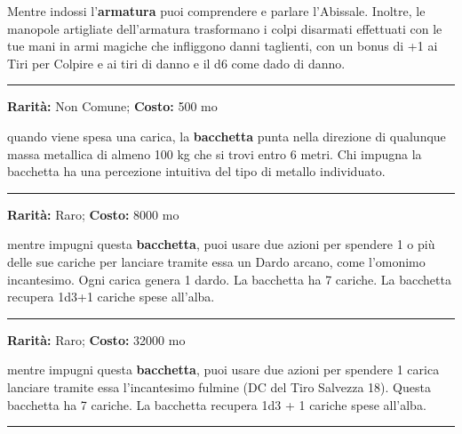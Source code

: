 \begin{multicols}{2}
Mentre indossi l'\textbf{armatura} puoi comprendere e parlare l'Abissale. Inoltre, le manopole artigliate dell'armatura trasformano i colpi disarmati effettuati con le tue mani in armi magiche che infliggono danni taglienti, con un bonus di +1 ai Tiri per Colpire e ai tiri di danno e il d6 come dado di danno.

\smallskip\noindent\rule{\linewidth}{2pt}  \hypertarget{BacchettaCercametalli}{}\medskip{}\noindent\label{BacchettaCercametalli}

\textbf{Rarità:} Non Comune; \textbf{Costo:} 500 mo

quando viene spesa una carica, la \textbf{bacchetta} punta nella direzione di qualunque massa metallica di almeno 100 kg che si trovi entro 6 metri. Chi impugna la bacchetta ha una percezione intuitiva del tipo di metallo individuato.

\smallskip\noindent\rule{\linewidth}{2pt}  \hypertarget{BacchettadeiDardiArcani}{}\medskip{}\noindent\label{BacchettadeiDardiArcani}

\textbf{Rarità:} Raro; \textbf{Costo:} 8000 mo

mentre impugni questa \textbf{bacchetta}, puoi usare due azioni per spendere 1 o più delle sue cariche per lanciare tramite essa un Dardo arcano, come l'omonimo incantesimo. Ogni carica genera 1 dardo. La bacchetta ha 7 cariche. La bacchetta recupera 1d3+1 cariche spese all'alba.

\smallskip\noindent\rule{\linewidth}{2pt}  \hypertarget{BacchettadeiFulmini}{}\medskip{}\noindent\label{BacchettadeiFulmini}

\textbf{Rarità:} Raro; \textbf{Costo:} 32000 mo

mentre impugni questa \textbf{bacchetta}, puoi usare due azioni per spendere 1 carica lanciare tramite essa l'incantesimo fulmine (DC del Tiro Salvezza 18).
Questa bacchetta ha 7 cariche. La bacchetta recupera 1d3 + 1 cariche spese all'alba.

\smallskip\noindent\rule{\linewidth}{2pt}  \hypertarget{BacchettadeiSegreti}{}\medskip{}\noindent\label{BacchettadeiSegreti}


\end{multicols}
